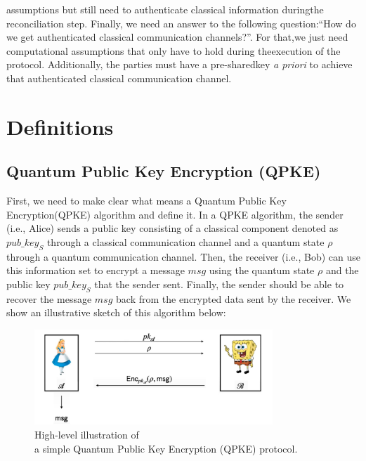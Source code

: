 \documentclass[12pt]{article}
\begin{document}
    \noindent assumptions but still need to authenticate classical information during\break the reconciliation step. Finally, we need an answer to the following question:\break ``How do we get authenticated classical communication channels?''. For that,\break we just need computational assumptions that only have to hold during the\break execution of the protocol. Additionally, the parties must have a pre-shared\break key \textit{a priori} to achieve that authenticated classical communication channel.
    
    \section{Definitions}
    \label{sec:definitions}

    \subsection{Quantum Public Key Encryption (QPKE)}
    \label{subsec:quantum-public-key-encryption}

    First, we need to make clear what means a Quantum Public Key Encryption\break (QPKE) algorithm and define it. In a QPKE algorithm, the sender (i.e., Alice) sends a public key consisting of a classical component denoted as ${pub\_key}_{S}$ through a classical communication channel and a quantum state $\rho$ through a quantum communication channel. Then, the receiver (i.e., Bob) can use this information set to encrypt a message $msg$ using the quantum state $\rho$ and the public key ${pub\_key}_{S}$ that the sender sent. Finally, the sender should be able to recover the message $msg$ back from the encrypted data sent by the receiver. We show an illustrative sketch of this algorithm below:
    
    \begin{figure}[ht]
        \captionsetup{justification=centering}
        \centering
        \includegraphics[width=0.8\textwidth]{figures/images/img-2.pdf}
        \caption{High-level illustration of\\ a simple Quantum Public Key Encryption (QPKE) protocol.}
    \end{figure}
\end{document}
